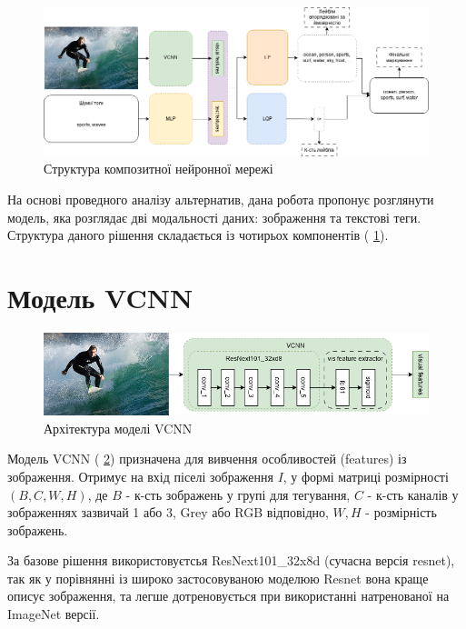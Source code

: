 \documentclass{udstu}
\begin{document}
\begin{figure}[!ht]
	\centering
	\includegraphics[width=1.0\textwidth]{PNG/composite}
	\caption{Структура композитної нейронної мережі}
	\label{figure:composite}
\end{figure}

На основі проведного аналізу альтернатив, дана робота пропонує розглянути
модель, яка розглядає дві модальності даних: зображення та текстові теги.
Структура даного рішення складається із чотирьох компонентів (\figurename{ \ref{figure:composite}}).


\section{Модель VCNN}

\begin{figure}[!ht]
	\centering
	\includegraphics[width=1.0\textwidth]{PNG/vcnn}
	\caption{Архітектура моделі VCNN}
	\label{figure:vcnn}
\end{figure}

Модель VCNN (\figurename{ \ref{figure:vcnn}}) призначена для вивчення особливостей (features) із зображення.
Отримує на вхід піселі зображення $I$, у формі матриці розмірності $(B,C,W,H)$, де
$B$ - к-сть зображень у групі для тегування,
$C$ - к-сть каналів у зображеннях зазвичай 1 або 3, Grey або RGB відповідно,
$W,H$ - розмірність зображень.

За базове рішення використовуєтсья ResNext101\_32x8d \cite{resnext} (сучасна версія resnet),
так як у порівнянні із широко застосовуваною моделюю Resnet \cite{resnet} вона краще описує
зображення, та легше дотреновується при використанні натренованої на ImageNet \cite{deng2009imagenet} версії.
\end{document}
